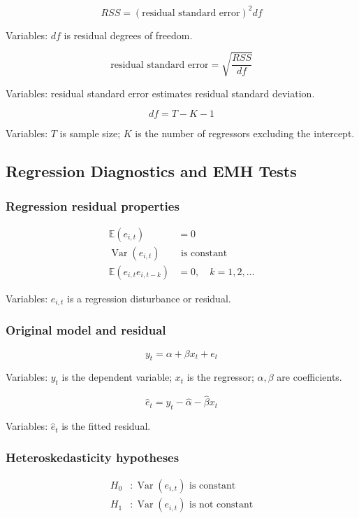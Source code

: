 \documentclass[
  8pt,
  twocolumn]{extarticle}
\begin{document}
\[
RSS=(\text{residual standard error})^2df
\]

Variables: \(df\) is residual degrees of freedom.

\[
\text{residual standard error}=\sqrt{\frac{RSS}{df}}
\]

Variables: residual standard error estimates residual standard
deviation.

\[
df=T-K-1
\]

Variables: \(T\) is sample size; \(K\) is the number of regressors
excluding the intercept.

\subsection{Regression Diagnostics and EMH
Tests}\label{regression-diagnostics-and-emh-tests}

\subsubsection{Regression residual
properties}\label{regression-residual-properties}

\[
\begin{aligned}
\mathbb E(e_{i,t})&=0\\
\operatorname{Var}(e_{i,t})&\text{ is constant}\\
\mathbb E(e_{i,t}e_{i,t-k})&=0,\quad k=1,2,\ldots
\end{aligned}
\]

Variables: \(e_{i,t}\) is a regression disturbance or residual.

\subsubsection{Original model and
residual}\label{original-model-and-residual}

\[
y_t=\alpha+\beta x_t+e_t
\]

Variables: \(y_t\) is the dependent variable; \(x_t\) is the regressor;
\(\alpha,\beta\) are coefficients.

\[
\hat e_t=y_t-\hat\alpha-\hat\beta x_t
\]

Variables: \(\hat e_t\) is the fitted residual.

\subsubsection{Heteroskedasticity
hypotheses}\label{heteroskedasticity-hypotheses}

\[
\begin{aligned}
H_0&:\operatorname{Var}(e_{i,t})\text{ is constant}\\
H_1&:\operatorname{Var}(e_{i,t})\text{ is not constant}
\end{aligned}
\]
\end{document}

